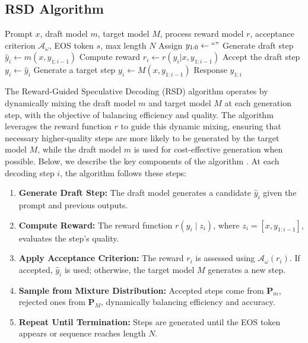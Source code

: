 \documentclass{article}
\theoremstyle{plain}
\theoremstyle{definition}
\theoremstyle{remark}
\begin{document}
\subsection{RSD Algorithm}




\begin{algorithm}[tb]
   \caption{RSD: Reward-Guided Speculative Decoding}
   \label{alg:alg1}
   \footnotesize
\begin{algorithmic}
    Prompt $x$, draft model $m$, target model $M$, process reward model $r$, acceptance criterion $\mathcal{A}_\omega$,
   EOS token $s$, max length $N$  
    \STATE Assign $y_{1:0} \gets ``"$
   \STATE Generate draft step $\hat{y}_i \gets m(x,y_{1:i-1})$
   \STATE Compute reward $r_i \gets r(y_i|x, y_{1:i-1}) $
   \STATE Accept the draft step $y_i\gets\hat{y}_i$
   \ELSE
   \STATE Generate a target step ${y}_i \gets M(x,y_{1:i-1})$
   \ENDIF
   \ENDIF
   \ENDFOR
{} Response $y_{1:i}$
\end{algorithmic}
\end{algorithm}





The Reward-Guided Speculative Decoding (RSD) algorithm operates by dynamically mixing the draft model \( m \) and target model \( M \) at each generation step, with the objective of balancing efficiency and quality. The algorithm leverages the reward function \( r \) to guide this dynamic mixing, ensuring that necessary higher-quality steps are more likely to be generated by the target model \( M \), while the draft model \( m \) is used for cost-effective generation when possible. Below, we describe the key components of the algorithm . At each decoding step \( i \), the algorithm follows these steps:
\begin{enumerate}[itemsep=0pt]
    \item \textbf{Generate Draft Step:} The draft model generates a candidate \( \hat{y}_i \) given the prompt and previous outputs.
    \item \textbf{Compute Reward:} The reward function \( r(y_i \mid z_i) \), where \( z_i = [x, y_{1:i-1}] \), evaluates the step’s quality.
    \item \textbf{Apply Acceptance Criterion:} The reward \( r_i \) is assessed using \( \mathcal{A}_\omega(r_i) \). If accepted, \( \hat{y}_i \) is used; otherwise, the target model \( M \) generates a new step.
    \item \textbf{Sample from Mixture Distribution:} Accepted steps come from \( \mathbf{P}_m \), rejected ones from \( \mathbf{P}_M \), dynamically balancing efficiency and accuracy.
    \item \textbf{Repeat Until Termination:} Steps are generated until the EOS token appears or sequence reaches length \( N \).
\end{enumerate}
\end{document}
